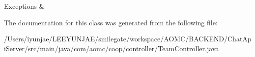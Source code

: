 \begin{DoxyExceptions}{Exceptions}
{\em } & \\
\hline
\end{DoxyExceptions}


The documentation for this class was generated from the following file\+:\begin{DoxyCompactItemize}
\item 
/\+Users/iyunjae/\+L\+E\+E\+Y\+U\+N\+J\+A\+E/smilegate/workspace/\+A\+O\+M\+C/\+B\+A\+C\+K\+E\+N\+D/\+Chat\+Api\+Server/src/main/java/com/aomc/coop/controller/Team\+Controller.\+java\end{DoxyCompactItemize}
